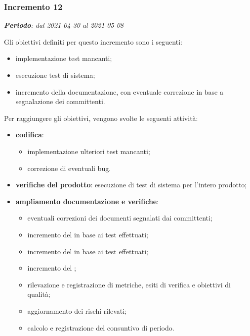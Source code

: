 \subsubsection{Incremento 12}
\textit{\textbf{Periodo}: dal 2021-04-30 al 2021-05-08}

Gli obiettivi definiti per questo incremento sono i seguenti:
\begin{itemize}
\item implementazione test mancanti;
\item esecuzione test di sistema;
\item incremento della documentazione, con eventuale correzione in base a segnalazione dei committenti.
\end{itemize}

Per raggiungere gli obiettivi, vengono svolte le seguenti attività:
\begin{itemize}
\item \textbf{codifica}: 
\begin{itemize}
\item implementazione ulteriori test mancanti;
\item correzione di eventuali bug.
\end{itemize} 

\item \textbf{verifiche del prodotto}: esecuzione di test di sistema per l'intero prodotto;

\item \textbf{ampliamento documentazione e verifiche}:
\begin{itemize}
\item eventuali correzioni dei documenti segnalati dai committenti;
\item incremento del  in base ai test effettuati;
\item incremento del  in base ai test effettuati;
\item incremento del ;
\item rilevazione e registrazione di metriche, esiti di verifica e obiettivi di qualità;
\item aggiornamento dei rischi rilevati;
\item calcolo e registrazione del consuntivo di periodo.
\end{itemize}

\end{itemize}
